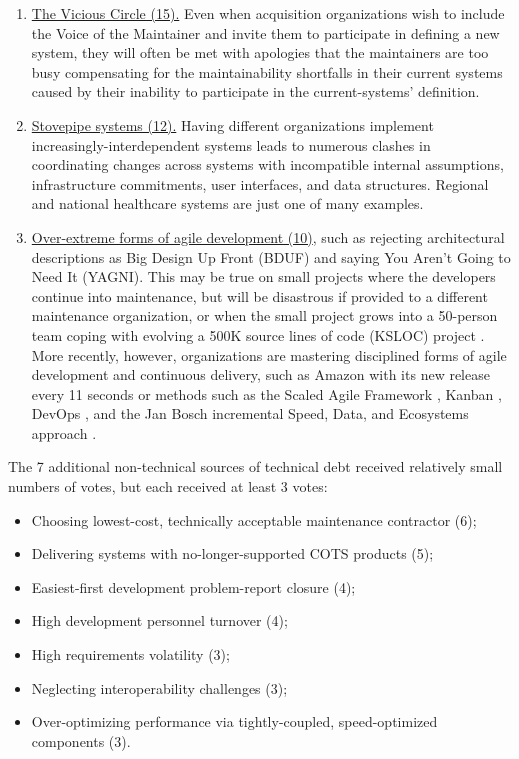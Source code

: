 \begin{enumerate}
	\item \ul{The Vicious Circle (15).}
	Even when acquisition organizations wish to include the Voice of the Maintainer and invite them to participate in defining a new system, they will often be met with apologies that the maintainers are too busy compensating for the maintainability shortfalls in their current systems caused by their inability to participate in the current-systems' definition.
	\item \ul{Stovepipe systems (12).}
	Having different organizations implement increasingly-interdependent systems leads to numerous clashes in coordinating changes across systems with incompatible internal assumptions, infrastructure commitments, user interfaces, and data structures.
	Regional and national healthcare systems are just one of many examples.
	\item \ul{ Over-extreme forms of agile development (10)}, such as rejecting architectural descriptions as Big Design Up Front (BDUF) and saying You Aren't Going to Need It (YAGNI).
	This may be true on small projects where the developers continue into maintenance, but will be disastrous if provided to a different maintenance organization, or when the small project grows into a 50-person team coping with evolving a 500K source lines of code (KSLOC) project \cite{1008006}.
	More recently, however, organizations are mastering disciplined forms of agile development and continuous delivery, such as Amazon with its new release every 11 seconds or methods such as the Scaled Agile Framework \cite{leffingwell2007scaling}, Kanban \cite{anderson2010kanban}, DevOps \cite{davis2016effective}, and the Jan Bosch incremental Speed, Data, and Ecosystems approach \cite{bosch2017speed}.
\end{enumerate}

The 7 additional non-technical sources of technical debt received relatively small numbers of votes, but each received at least 3 votes:
\begin{itemize}
	\item Choosing lowest-cost, technically acceptable maintenance contractor (6);
	\item Delivering systems with no-longer-supported COTS products (5);
	\item Easiest-first development problem-report closure (4);
	\item High development personnel turnover (4);
	\item High requirements volatility (3);
	\item Neglecting interoperability challenges (3);
	\item Over-optimizing performance via tightly-coupled, speed-optimized components (3).
\end{itemize}

